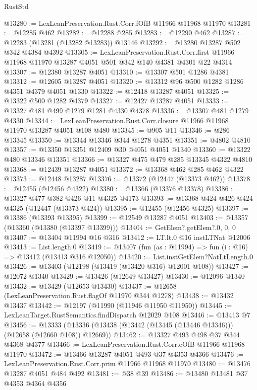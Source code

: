 \begin{lexlean}{RustStd}
\begin{coremodule}
@13280 := LexLeanPreservation.Rust.Corr.fOfB @11966 @11968 @11970
@13281 := @12285 @462
@13282 := @12288 @285
@13283 := @12290 @462
@13287 := @12283 (@13281 (@13282 @13283)) @13146
@13292 := @13280 @13287 @502 @342 @4384 @4392
@13305 := LexLeanPreservation.Rust.Corr.first
    @11966
    @11968
    @11970
    @13287
    @4051
    @501
    @342
    @140
    @4381
    @4301
    @22
    @4314
@13307 := @12380 @13287 @4051
@13310 := @13307 @501 @1286 @4381
@13312 := @12605 @13287 @4051
@13320 := @13312 @96 @500 @1282 @1286 @4351 @4379 @4051 @1330
@13322 := @12418 @13287 @4051
@13325 := @13322 @500 @1282 @4379
@13327 := @12427 @13287 @4051
@13333 := @13327 @481 @499 @1279 @1281 @4330 @4378
@13336 := @13307 @481 @1279 @4330
@13344 := LexLeanPreservation.Rust.Corr.closure @11966 @11968 @11970 @13287 @4051 @108 @480
@13345 := @905 @11
@13346 := @286 @13345
@13350 := @13344 @13346 @344 @1278 @4351
@13351 := @4802 @4810
@13357 := @13350 @13351 @12409 @30 @4051 @4051 @1340
@13360 := @13322 @480 @13346 @13351
@13366 := @13327 @475 @479 @285 @13345 @4322 @4810
@13368 := @12439 @13287 @4051
@13372 := @13368 @462 @285 @462 @4322
@13373 := @12448 @13287
@13376 := @13372 (@12447 (@13373 @462))
@13378 := @12455 (@12456 @4322)
@13380 := @13366 (@13376 @13378)
@13386 := @13327 @477 @382 @426 @11 @4325 @4173
@13393 := @13368 @424 @426 @424 @4325 (@12447 (@13373 @424))
@13395 := @12455 (@12456 @4325)
@13397 := @13386 (@13393 @13395)
@13399 := @12549 @13287 @4051
@13403 := @13357 (@13360 (@13380 (@13397 @13399)))
@13404 := GetElem?.getElem?.{0, 0, 0}
@13407 := @13404 @11994 @16 @316
@13412 := LT.lt.{0} @16 instLTNat @12006
@13413 := List.length.{0}
@13419 := @13407 (fun (as : @11994) => fun (i : @16) => @13412 (@13413 @316 @12050))
@13420 := List.instGetElem?NatLtLength.{0}
@13426 := @13403 (@12198 (@13419 (@13420 @316) @12001 @108))
@13427 := @12072 @1340
@13429 := @13426 (@12649 @13427)
@13430 := @12096 @1340
@13432 := @13429 (@12653 @13430)
@13437 := @12658 (LexLeanPreservation.Rust.flagOf @11970 @344 @1278)
@13438 := @13432 @13437
@13442 := @12197 (@11990 (@11946 @11950 @11950))
@13445 := LexLeanTarget.RustSemantics.findDispatch @12029 @108
@13446 := @13413 @7
@13456 := @13333 (@13336 (@13438 (@13442 (@13445 (@13446 @13346))) (@12658 (@12660 @108)) @12669))
@13462 := @13327 @493 @498 @37 @344 @4368 @4377
@13466 := LexLeanPreservation.Rust.Corr.eOfB @11966 @11968 @11970
@13472 := @13466 @13287 @4051 @493 @37 @4353 @4366
@13476 := LexLeanPreservation.Rust.Corr.prim @11966 @11968 @11970
@13480 := @13476 @13287 @4051 @484 @492
@13481 := @38 @39
@13486 := @13480 @13481 @37 @4353 @4364 @4356

\end{coremodule}
\end{lexlean}
